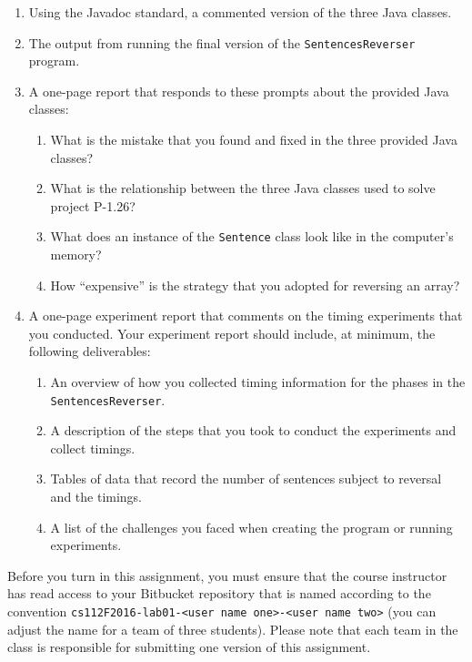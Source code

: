 \vspace*{-.05in}
\begin{enumerate}

  \itemsep 0em
  \item Using the Javadoc standard, a commented version of the three Java classes.

  \item The output from running the final version of the {\tt SentencesReverser} program.

  \item A one-page report that responds to these prompts about the provided Java classes:

    \vspace*{-.05in}
    \begin{enumerate}
      \itemsep 0em

      \item What is the mistake that you found and fixed in the three provided Java classes?

      \item What is the relationship between the three Java classes used to solve project P-1.26?

      \item What does an instance of the {\tt Sentence} class look like in the computer's memory?

      \item How ``expensive'' is the strategy that you adopted for reversing an array?

    \end{enumerate}

  \item A one-page experiment report that comments on the timing experiments that you conducted. Your experiment report
    should include, at minimum, the following deliverables:

    \vspace*{-.05in}
    \begin{enumerate}
      \itemsep 0em
      \item An overview of how you collected timing information for the phases in the {\tt  SentencesReverser}.
      \item A description of the steps that you took to conduct the experiments and collect timings.
      \item Tables of data that record the number of sentences subject to reversal and the timings.
      \item A list of the challenges you faced when creating the program or running experiments.
    \end{enumerate}

\end{enumerate}

\vspace*{-.05in}

Before you turn in this assignment, you must ensure that the course instructor has read access to your Bitbucket
repository that is named according to the convention {\tt cs112F2016-lab01-<user name one>-<user name two>} (you can
adjust the name for a team of three students). Please note that each team in the class is responsible for submitting one
version of this assignment.


